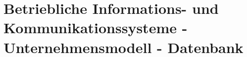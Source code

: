 \newcommand{\customDir}{../}








%



\maketitle
\newpage
\tableofcontents
\newpage



\chapter[Datenbank als System und Modell]{Betriebliche Informations- und Kommunikationssysteme - Unternehmensmodell - Datenbank}

